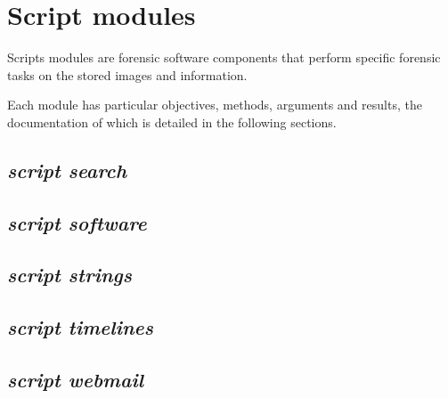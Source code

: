 \documentclass[a4paper,11pt,oneside]{report}
\begin{document}
\chapter{Script modules} \label{sec:modules}

Scripts modules are forensic software components that perform specific forensic tasks on the stored images and information.

Each module has particular objectives, methods, arguments and results, the documentation of which is detailed in the following sections.



\section{\emph{script search}}


\section{\emph{script software}}


\section{\emph{script strings}}


\section{\emph{script timelines}}


\section{\emph{script webmail}}
\end{document}
